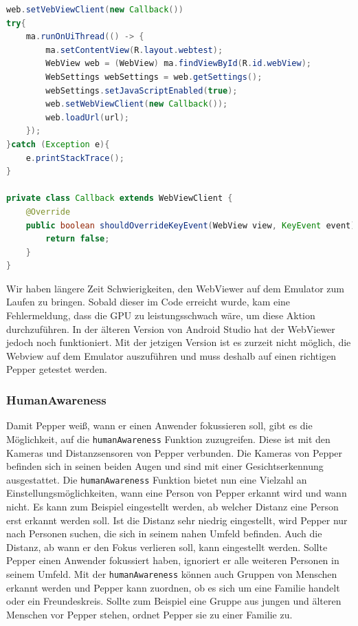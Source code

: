 \begin{lstlisting}[language=Java, caption={Webview Grundgerüst}]
web.setVebViewClient(new Callback())
try{
    ma.runOnUiThread(() -> {
        ma.setContentView(R.layout.webtest);
        WebView web = (WebView) ma.findViewById(R.id.webView);
        WebSettings webSettings = web.getSettings();
        webSettings.setJavaScriptEnabled(true);
        web.setWebViewClient(new Callback());
        web.loadUrl(url);
    });
}catch (Exception e){
    e.printStackTrace();
}

private class Callback extends WebViewClient {
    @Override
    public boolean shouldOverrideKeyEvent(WebView view, KeyEvent event){
        return false;
    }
}
\end{lstlisting}
Wir haben längere Zeit Schwierigkeiten, den WebViewer auf dem Emulator zum Laufen zu bringen. Sobald dieser im Code erreicht wurde, kam eine Fehlermeldung, dass die GPU zu leistungsschwach wäre, um diese Aktion durchzuführen. In der älteren Version von Android Studio hat der WebViewer 
jedoch noch funktioniert. Mit der jetzigen Version ist es zurzeit nicht möglich, die Webview auf dem Emulator auszuführen und muss deshalb auf einen richtigen Pepper getestet werden.\\

\subsubsection{HumanAwareness}

Damit Pepper weiß, wann er einen Anwender fokussieren soll, gibt es die Möglichkeit, auf die \verb|humanAwareness| Funktion zuzugreifen. Diese ist mit den Kameras und Distanzsensoren von Pepper verbunden. Die Kameras von Pepper befinden sich in seinen beiden Augen und sind mit einer Gesichtserkennung ausgestattet. Die \verb|humanAwareness| Funktion bietet nun eine Vielzahl an Einstellungsmöglichkeiten, wann eine Person von Pepper erkannt wird und wann nicht. Es kann zum Beispiel eingestellt werden, ab welcher Distanz eine Person erst erkannt werden soll. Ist die Distanz sehr niedrig eingestellt, wird Pepper nur nach Personen suchen, die sich in seinem nahen Umfeld befinden. Auch die Distanz, ab wann er den Fokus verlieren soll, kann eingestellt werden. Sollte Pepper einen Anwender fokussiert haben, ignoriert er alle weiteren Personen in seinem Umfeld. Mit der \verb|humanAwareness| können auch Gruppen von Menschen erkannt werden und Pepper kann zuordnen, ob es sich um eine Familie handelt oder ein Freundeskreis. Sollte zum Beispiel eine Gruppe aus jungen und älteren Menschen vor Pepper stehen, ordnet Pepper sie zu einer Familie zu.\\

